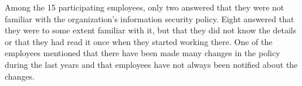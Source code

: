 \documentclass[b5paper, twoside, openright, 11pt]{report}
\begin{document}

Among the 15 participating employees, only two answered that they were not familiar with the organization's information security policy. Eight answered that they were to some extent familiar with it, but that they did not know the details or that they had read it once when they started working there. One of the employees mentioned that there have been made many changes in the policy during the last years and that employees have not always been notified about the changes.
\end{document}
